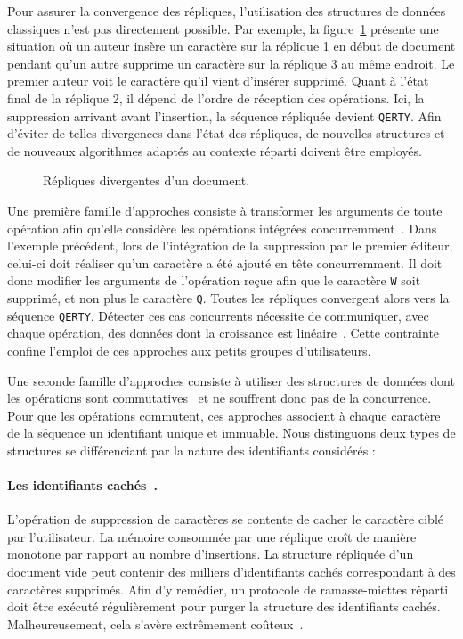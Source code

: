 Pour assurer la convergence des répliques, l'utilisation des structures de
données \og classiques \fg n'est pas directement possible. %
Par exemple, la figure~\ref{intro:fig:ripconvergence} présente une situation où
un auteur insère un caractère sur la réplique 1 en début de document pendant
qu'un autre supprime un caractère sur la réplique 3 au même endroit. Le premier
auteur voit le caractère qu'il vient d'insérer supprimé. Quant à l'état final de
la réplique 2, il dépend de l'ordre de réception des opérations. Ici, la
suppression arrivant avant l'insertion, la séquence répliquée devient
\texttt{QERTY}.  Afin d'éviter de telles divergences dans l'état des répliques,
de nouvelles structures et de nouveaux algorithmes adaptés au contexte réparti
doivent être employés.


\begin{figure}
  
  \caption{\label{intro:fig:ripconvergence} Répliques divergentes d'un
    document.}
\end{figure}


Une première famille d'approches consiste à transformer les arguments de toute
opération afin qu'elle considère les opérations intégrées
concurremment~\cite{sun1998operational}. Dans l'exemple précédent, lors de
l'intégration de la suppression par le premier éditeur, celui-ci doit réaliser
qu'un caractère a été ajouté en tête concurremment. Il doit donc modifier les
arguments de l'opération reçue afin que le caractère \texttt{W} soit supprimé,
et non plus le caractère \texttt{Q}. Toutes les répliques convergent alors vers
la séquence \texttt{QERTY}.  Détecter ces cas concurrents nécessite de
communiquer, avec chaque opération, des données dont la croissance est
linéaire~\cite{charronbost1991concerning, sun2009contextbased}. Cette contrainte
confine l'emploi de ces approches aux petits groupes d'utilisateurs.

Une seconde famille d'approches consiste à utiliser des structures de données
dont les opérations sont commutatives~\cite{shapiro2011conflict} et ne souffrent
donc pas de la concurrence. Pour que les opérations commutent, ces approches
associent à chaque caractère de la séquence un identifiant unique et
immuable. Nous distinguons deux types de structures se différenciant par la
nature des identifiants considérés :

\paragraph{Les identifiants cachés~\cite{oster2006data}.} L'opération de
suppression de caractères se contente de cacher le caractère ciblé par
l'utilisateur. La mémoire consommée par une réplique croît de manière monotone
par rapport au nombre d'insertions.
La structure répliquée d'un document vide peut contenir des milliers
d'identifiants cachés correspondant à des caractères supprimés.  Afin d'y
remédier, un protocole de ramasse-miettes réparti~\cite{abdullahi1998garbage}
doit être exécuté régulièrement pour purger la structure des identifiants
cachés. Malheureusement, cela s'avère extrêmement
coûteux~\cite{abdullahi1998garbage}.

